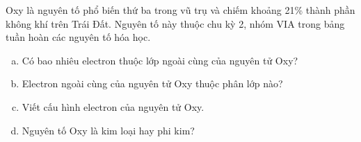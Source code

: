 \begin{bt}%
	Oxy là nguyên tố phổ biến thứ ba trong vũ trụ và chiếm khoảng 21\% thành phần không khí trên Trái Đất. Nguyên tố này thuộc chu kỳ 2, nhóm VIA trong bảng tuần hoàn các nguyên tố hóa học.
	\begin{enumerate}[a)]
		\item Có bao nhiêu electron thuộc lớp ngoài cùng của nguyên tử Oxy?
		\item Electron ngoài cùng của nguyên tử Oxy thuộc phân lớp nào?
		\item Viết cấu hình electron của nguyên tử Oxy.
		\item Nguyên tố Oxy là kim loại hay phi kim?
	\end{enumerate}
\end{bt}

